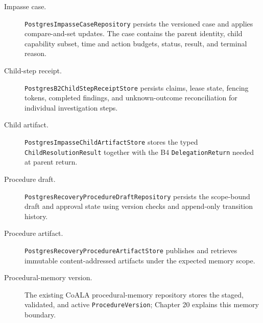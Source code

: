 \begin{description}
  \item[Impasse case.] \texttt{Postgres\allowbreak Impasse\allowbreak Case\allowbreak Repository} persists the versioned case and applies compare-and-set updates. The case contains the parent identity, child capability subset, time and action budgets, status, result, and terminal reason.
  \item[Child-step receipt.] \texttt{Postgres\allowbreak B2\allowbreak Child\allowbreak Step\allowbreak Receipt\allowbreak Store} persists claims, lease state, fencing tokens, completed findings, and unknown-outcome reconciliation for individual investigation steps.
  \item[Child artifact.] \texttt{Postgres\allowbreak Impasse\allowbreak Child\allowbreak Artifact\allowbreak Store} stores the typed \texttt{Child\allowbreak Resolution\allowbreak Result} together with the B4 \texttt{Delegation\allowbreak Return} needed at parent return.
  \item[Procedure draft.] \texttt{Postgres\allowbreak Recovery\allowbreak Procedure\allowbreak Draft\allowbreak Repository} persists the scope-bound draft and approval state using version checks and append-only transition history.
  \item[Procedure artifact.] \texttt{Postgres\allowbreak Recovery\allowbreak Procedure\allowbreak Artifact\allowbreak Store} publishes and retrieves immutable content-addressed artifacts under the expected memory scope.
  \item[Procedural-memory version.] The existing CoALA procedural-memory repository stores the staged, validated, and active \texttt{Procedure\allowbreak Version}; Chapter 20 explains this memory boundary.
\end{description}

